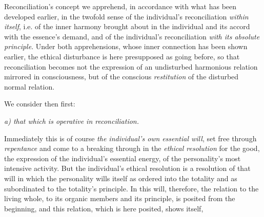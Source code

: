 \documentclass[12pt,a4paper]{book}
\begin{document}
Reconciliation's concept we apprehend, in accordance with what has been
developed earlier, in the twofold sense of the individual's reconciliation
\emph{within itself}, i.e. of the inner harmony brought about in the individual
and its accord with the essence's demand, and of the individual's
reconciliation \emph{with its absolute principle}. Under both apprehensions,
whose inner connection has been shown earlier, the ethical disturbance is here
presupposed as going before, so that reconciliation becomes not the expression
of an undisturbed harmonious relation mirrored in consciousness, but of the
conscious \emph{restitution} of the disturbed normal relation.

We consider then first:

\begin{center}
\emph{a) that which is operative in reconciliation.}
\end{center}

Immediately this is of course \emph{the individual's own} \emph{essential will},
set free through \emph{repentance} and come to a breaking through in the
\emph{ethical resolution} for the good, the expression of the individual's
essential energy, of the personality's most intensive activity. But the
individual's ethical resolution is a resolution of that will in which the
personality wills itself as ordered into the totality and as subordinated to the
totality's principle. In this will, therefore, the relation to the living whole,
to its organic members and its principle, is posited from the beginning, and
this relation, which is here posited, shows itself,
\end{document}
